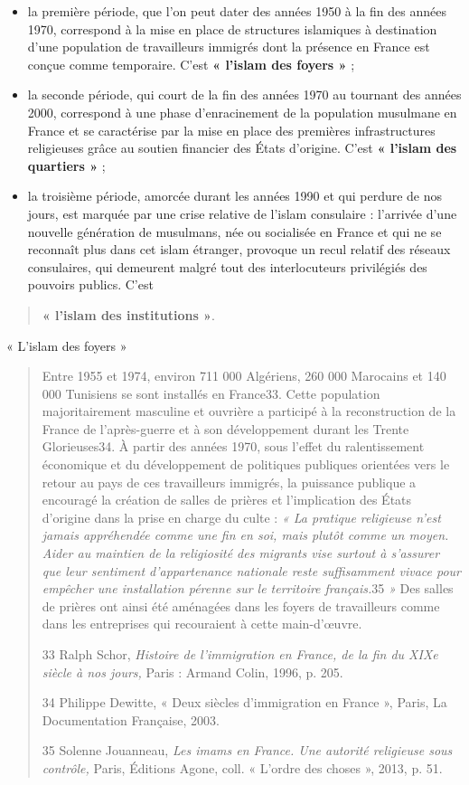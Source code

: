 \begin{itemize}
\item
  la première période, que l'on peut dater des années 1950 à la fin des
  années 1970, correspond à la mise en place de structures islamiques à
  destination d'une population de travailleurs immigrés dont la présence
  en France est conçue comme temporaire. C'est \textbf{« l'islam des
  foyers »} ;
\item
  la seconde période, qui court de la fin des années 1970 au tournant
  des années 2000, correspond à une phase d'enracinement de la
  population musulmane en France et se caractérise par la mise en place
  des premières infrastructures religieuses grâce au soutien financier
  des États d'origine. C'est \textbf{« l'islam des quartiers »} ;
\item
  la troisième période, amorcée durant les années 1990 et qui perdure de
  nos jours, est marquée par une crise relative de l'islam consulaire :
  l'arrivée d'une nouvelle génération de musulmans, née ou socialisée en
  France et qui ne se reconnaît plus dans cet islam étranger, provoque
  un recul relatif des réseaux consulaires, qui demeurent malgré tout
  des interlocuteurs privilégiés des pouvoirs publics. C'est
\end{itemize}

\begin{quote}
\textbf{« l'islam des institutions »}.
\end{quote}

« L'islam des foyers »

\begin{quote}
Entre 1955 et 1974, environ 711 000 Algériens, 260 000 Marocains et 140
000 Tunisiens se sont installés en France33. Cette population
majoritairement masculine et ouvrière a participé à la reconstruction de
la France de l'après-guerre et à son développement durant les Trente
Glorieuses34. À partir des années 1970, sous l'effet du ralentissement
économique et du développement de politiques publiques orientées vers le
retour au pays de ces travailleurs immigrés, la puissance publique a
encouragé la création de salles de prières et l'implication des États
d'origine dans la prise en charge du culte : \emph{« La pratique
religieuse n'est jamais appréhendée comme une fin en soi, mais plutôt
comme un moyen. Aider au maintien de la religiosité des migrants vise
surtout à s'assurer que leur sentiment d'appartenance nationale reste
suffisamment vivace pour empêcher une installation pérenne sur le
territoire français.}35 \emph{»} Des salles de prières ont ainsi été
aménagées dans les foyers de travailleurs comme dans les entreprises qui
recouraient à cette main-d'œuvre.

33 Ralph Schor, \emph{Histoire de l'immigration en France, de la fin du
XIXe siècle à nos jours,} Paris : Armand Colin, 1996, p. 205.

34 Philippe Dewitte, « Deux siècles d'immigration en France », Paris, La
Documentation Française, 2003.

35 Solenne Jouanneau, \emph{Les imams en France. Une autorité religieuse
sous contrôle,} Paris, Éditions Agone, coll. « L'ordre des choses »,
2013, p. 51.


\end{quote}

